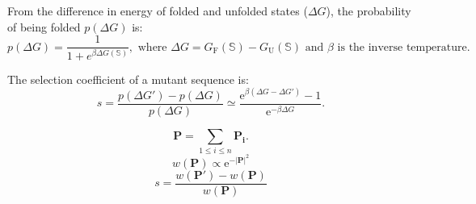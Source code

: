 \documentclass{article}
\newcommand{\e}{\mathrm{e}}
\begin{document}
From the difference in energy of folded and unfolded states ($\Delta G$), the probability of being folded $p(\Delta G)$ is:
\begin{equation*}
p(\Delta G) = \dfrac{1}{1 + e^{\beta \Delta G(\mathbb{S}) }}, \text{ where }
\Delta G = G_{\mathrm{F}}(\mathbb{S}) - G_{\mathrm{U}}(\mathbb{S}) \text{ and $\beta$ is the inverse temperature}.
\end{equation*}

The selection coefficient of a mutant sequence is:
\begin{equation*}
s  = \dfrac{p(\Delta G') - p(\Delta G)}{p(\Delta G)} \simeq \dfrac{ \e^{\beta \left( \Delta G - \Delta G' \right) } - 1}{ \e^{- \beta \Delta G }}.
\end{equation*}

\begin{center}
\end{center}
\begin{equation*}
\bm{P}  = \sum_{1 \leq i \leq n} \bm{P_i}.
\end{equation*}
\begin{equation*}
w(\bm{P}) \propto \e^{ - \left| \bm{P} \right|^2 }
\end{equation*}
\begin{equation*}
s  = \dfrac{w(\bm{P'}) - w(\bm{P})}{w(\bm{P})}
\end{equation*}
\end{document}
